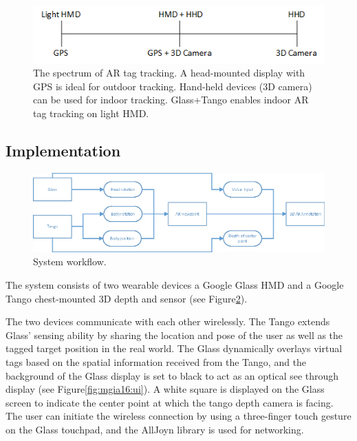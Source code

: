 \begin{figure}[ht]
  \centering
  \includegraphics[width=.8\linewidth]{images/mgia16/tango_paper_continuum}
  \caption{The spectrum of AR tag tracking. A head-mounted display with GPS is ideal for outdoor tracking. Hand-held devices (3D camera) can be used for indoor tracking. Glass+Tango enables indoor AR tag tracking on light HMD.}
  \label{fig:mgia16:spectrum}
\end{figure}

\subsection{Implementation}


\begin{figure}[t]
  \centering
  \includegraphics[width=\linewidth]{images/mgia16/workflow_diagram}
  \caption{System workflow.}
  \label{framework}
\end{figure}


The system consists of two wearable devices a Google Glass HMD and a Google Tango chest-mounted 3D depth and sensor (see Figure\ref{framework}).

The two devices communicate with each other wirelessly. The Tango extends Glass' sensing ability by sharing the location and pose of the user as well as the tagged target position in the real world. The Glass dynamically overlays virtual tags based on the spatial information received from the Tango, and the background of the Glass display is set to black to act as an optical see through display (see Figure\ref{fig:mgia16:ui}). A white square is displayed on the Glass screen to indicate the center point at which the tango depth camera is facing. The user can initiate the wireless connection by using a three-finger touch gesture on the Glass touchpad, and the AllJoyn library  is used for networking.

